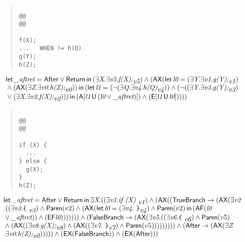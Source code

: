 \documentclass{article}
\newcommand{\U}{\,\mbox{\sf{U}}\,}
\newcommand{\A}{\mbox{\sf{A}}}
\newcommand{\E}{\mbox{\sf{E}}}
\newcommand{\AX}{\mbox{\sf{AX}}}
\newcommand{\EX}{\mbox{\sf{EX}}}
\newcommand{\AF}{\mbox{\sf{AF}}}
\newcommand{\EF}{\mbox{\sf{EF}}}
\newcommand{\mita}[1]{\mbox{\it{{#1}}}}
\newcommand{\msf}[1]{\mbox{\sf{{#1}}}}
\newcommand{\ttlb}{\mbox{\tt \char'173}}
\newcommand{\ttrb}{\mbox{\tt \char'175}}
\begin{document}
\begin{quote}\begin{verbatim}

@@
@@

f(X);
...   WHEN != h(Q)
g(Y);
h(Z);
\end{verbatim}\end{quote}

\[\begin{array}{l}
\mita{\sf{let}} \, \mita{\_aftret} = \msf{After} \vee \msf{Return} \, \mita{\sf{in}} \, (\exists \mita{X} . \exists \mita{v5} . \mita{f(X);}_{\mita{v5}}) \wedge (\AX(\mita{\sf{let}} \, \mita{l0} = (\exists \mita{Y} . \exists \mita{v1} . \mita{g(Y);}_{\mita{v1}})\\\mbox{} \wedge (\AX(\exists \mita{Z} . \exists \mita{v0} . \mita{h(Z);}_{\mita{v0}})) \, \mita{\sf{in}} \, (\mita{\sf{let}} \, \mita{l1} = (\neg (\exists \mita{Q} . \exists \mita{v4} . \mita{h(Q)}_{\mita{v4}})) \wedge (\neg ((\exists \mita{Y} . \exists \mita{v3} . \mita{g(Y);}_{\mita{v3}})\\\mbox{} \vee (\exists \mita{X} . \exists \mita{v2} . \mita{f(X);}_{\mita{v2}}))) \, \mita{\sf{in}} \, (\A[\mita{l1} \U (\mita{l0} \vee \mita{\_aftret})]
) \wedge (\E[\mita{l1} \U \mita{l0}]
)
)
))

\end{array}\]

\begin{quote}\begin{verbatim}

@@
@@

if (X) {
  ...
} else {
  g(X);
}
h(Z);
\end{verbatim}\end{quote}

\[\begin{array}{l}
\mita{\sf{let}} \, \mita{\_aftret} = \msf{After} \vee \msf{Return} \, \mita{\sf{in}} \, \exists \mita{X} . ((\exists \mita{v1} . \mita{if (X) }_{\mita{v1}}) \wedge (\AX((\msf{TrueBranch} \rightarrow (\AX(\exists \mita{v2}\\\mbox{} . ((\exists \mita{v3} . \mita{{\ttlb}
  }_{\mita{v3}}) \wedge \msf{Paren}(v2) \wedge (\AX(\mita{\sf{let}} \, \mita{l0} = (\exists \mita{v4} . \mita{
{\ttrb}}_{\mita{v4}}) \wedge \msf{Paren}(v2) \, \mita{\sf{in}} \, (\AF(\mita{l0}\\\mbox{} \vee \mita{\_aftret})) \wedge (\EF\mita{l0})
)))))) \wedge (\msf{FalseBranch} \rightarrow (\AX(\exists \mita{v5} . ((\exists \mita{v6} . \mita{{\ttlb}
  }_{\mita{v6}}) \wedge \msf{Paren}(v5)\\\mbox{} \wedge (\AX((\exists \mita{v8} . \mita{g(X);}_{\mita{v8}}) \wedge (\AX((\exists \mita{v7} . \mita{
{\ttrb}}_{\mita{v7}}) \wedge \msf{Paren}(v5))))))))) \wedge (\msf{After} \rightarrow (\AX(\exists \mita{Z}\\\mbox{} . \exists \mita{v0} . \mita{h(Z);}_{\mita{v0}}))))) \wedge (\EX(\msf{FalseBranch})) \wedge (\EX(\msf{After})))

\end{array}\]
\end{document}
